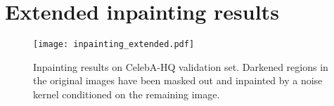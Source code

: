 \documentclass[10pt,twocolumn,letterpaper]{article}
\begin{document}
\newpage
\section{Extended inpainting results}\label{app:inpainting}

\begin{figure}[h!]
  \centering
  \texttt{[image: inpainting\_extended.pdf]}\caption{
    Inpainting results on CelebA-HQ validation set.
    Darkened regions in the original images have been masked out and inpainted by a noise kernel conditioned on the remaining image.
  }\end{figure}
\end{document}
